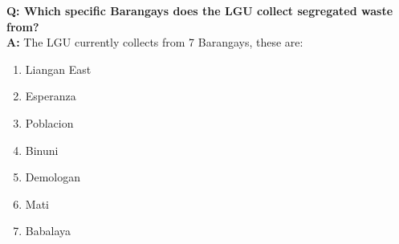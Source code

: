 \vspace{0.3cm}

\noindent \textbf{Q: Which specific Barangays does the LGU collect segregated waste from?} \\
\textbf{A:} The LGU currently collects from 7 Barangays, these are:
\begin{enumerate}
    \item Liangan East
    \item Esperanza
    \item Poblacion
    \item Binuni
    \item Demologan
    \item Mati
    \item Babalaya
\end{enumerate}